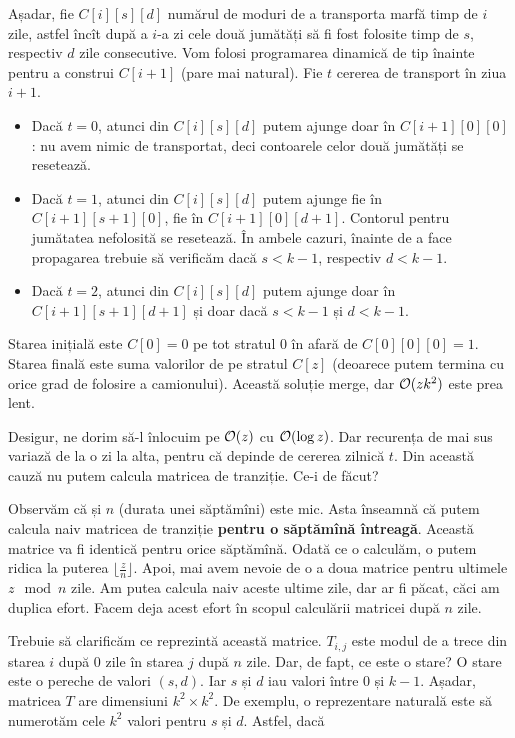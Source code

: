 \documentclass[../main.tex]{subfiles}
\begin{document}
Așadar, fie $C[i][s][d]$ numărul de moduri de a transporta marfă timp de $i$ zile, astfel încît după a $i$-a zi cele două jumătăți să fi fost folosite timp de $s$, respectiv $d$ zile consecutive. Vom folosi programarea dinamică de tip înainte pentru a construi $C[i + 1]$ (pare mai natural). Fie $t$ cererea de transport în ziua $i + 1$.

\begin{itemize}
  \item Dacă $t = 0$, atunci din $C[i][s][d]$ putem ajunge doar în $C[i + 1][0][0]$: nu avem nimic de transportat, deci contoarele celor două jumătăți se resetează.

  \item Dacă $t = 1$, atunci din $C[i][s][d]$ putem ajunge fie în $C[i + 1][s + 1][0]$, fie în $C[i + 1][0][d + 1]$. Contorul pentru jumătatea nefolosită se resetează. În ambele cazuri, înainte de a face propagarea trebuie să verificăm dacă $s < k - 1$, respectiv $d < k - 1$.

  \item Dacă $t = 2$, atunci din $C[i][s][d]$ putem ajunge doar în $C[i + 1][s + 1][d + 1]$ și doar dacă $s < k - 1$ și $d < k - 1$.
\end{itemize}

Starea inițială este $C[0] = 0$ pe tot stratul 0 în afară de $C[0][0][0] = 1$. Starea finală este suma valorilor de pe stratul $C[z]$ (deoarece putem termina cu orice grad de folosire a camionului). Această soluție merge, dar $\mathcal{O}(zk^2)$ este prea lent.

Desigur, ne dorim să-l înlocuim pe $\mathcal{O}(z)$ cu $\mathcal{O}(\log z)$. Dar recurența de mai sus variază de la o  zi la alta, pentru că depinde de cererea zilnică $t$. Din această cauză nu putem calcula matricea de tranziție. Ce-i de făcut?

Observăm că și $n$ (durata unei săptămîni) este mic. Asta înseamnă că putem calcula naiv matricea de tranziție \textbf{pentru o săptămînă întreagă}. Această matrice va fi identică pentru orice săptămînă. Odată ce o calculăm, o putem ridica la puterea $\lfloor \frac{z}{n}\rfloor$. Apoi, mai avem nevoie de o a doua matrice pentru ultimele $z \mod n$ zile. Am putea calcula naiv aceste ultime zile, dar ar fi păcat, căci am duplica efort. Facem deja acest efort în scopul calculării matricei după $n$ zile.

Trebuie să clarificăm ce reprezintă această matrice. $T_{i,j}$ este modul de a trece din starea $i$ după 0 zile în starea $j$ după $n$ zile. Dar, de fapt, ce este o stare? O stare este o pereche de valori $(s,d)$. Iar $s$ și $d$ iau valori între 0 și $k-1$. Așadar, matricea $T$ are dimensiuni $k^2 \times k^2$.  De exemplu, o reprezentare naturală este să numerotăm cele $k^2$ valori pentru $s$ și $d$. Astfel, dacă
\end{document}
